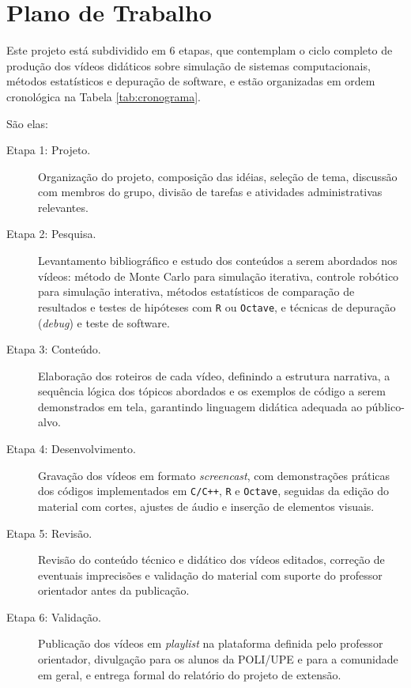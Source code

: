 \documentclass[a4paper,12pt]{article} %
\begin{document}
\section{Plano de Trabalho}
Este projeto está subdividido em 6 etapas, que contemplam o ciclo completo de produção dos vídeos didáticos sobre simulação de sistemas computacionais, métodos estatísticos e depuração de software, e estão organizadas em ordem cronológica na Tabela \ref{tab:cronograma}.

São elas:

\begin{description}
 \item[Etapa 1: Projeto.] Organização do projeto, composição das idéias, seleção de tema, discussão com membros do grupo, divisão de tarefas e atividades administrativas relevantes.
 \item[Etapa 2: Pesquisa.] Levantamento bibliográfico e estudo dos conteúdos a serem abordados nos vídeos: método de Monte Carlo para simulação iterativa, controle robótico para simulação interativa, métodos estatísticos de comparação de resultados e testes de hipóteses com \texttt{R} ou \texttt{Octave}, e técnicas de depuração (\textit{debug}) e teste de software.
 \item[Etapa 3: Conteúdo.] Elaboração dos roteiros de cada vídeo, definindo a estrutura narrativa, a sequência lógica dos tópicos abordados e os exemplos de código a serem demonstrados em tela, garantindo linguagem didática adequada ao público-alvo.
 \item[Etapa 4: Desenvolvimento.] Gravação dos vídeos em formato \textit{screencast}, com demonstrações práticas dos códigos implementados em \texttt{C/C++}, \texttt{R} e \texttt{Octave}, seguidas da edição do material com cortes, ajustes de áudio e inserção de elementos visuais.
 \item[Etapa 5: Revisão.] Revisão do conteúdo técnico e didático dos vídeos editados, correção de eventuais imprecisões e validação do material com suporte do professor orientador antes da publicação.
 \item[Etapa 6: Validação.] Publicação dos vídeos em \textit{playlist} na plataforma definida pelo professor orientador, divulgação para os alunos da POLI/UPE e para a comunidade em geral, e entrega formal do relatório do projeto de extensão.
\end{description}
\end{document}
